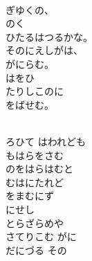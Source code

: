 \documentclass[10pt,b5j]{tarticle} %
\begin{document}
\vspace{1.5em} %
\newcommand{\linespace}{0.5em} %
\newcommand{\blocksize}{0.5\hsize} %
\newcommand{\itemmargin}{6em} %
\begin{enumerate} %
    \setlength{\itemindent}{\itemmargin} %
    \begin{minipage}[c]{\blocksize}
    
        \vspace{\linespace}
        \item~\\
        ぎゆくの、\\
        のく\\
        ひたるはつるかな。\\
        そのにえしがは、\\
        がにらむ。\\
        はをひ\\
        たりしこのに\\
        をばせむ。
        
        \vspace{\linespace}
        \item~\\
        ろひて はわれども\\
        もはらをさむ\\
        のをはらはむと\\
        むはにたれど\\
        をまむにず\\
        にせし\\
        とらざらめや\\
        さてりこむ がに\\
        だにづる その
        

\end{minipage}
\end{enumerate}
\end{document}
